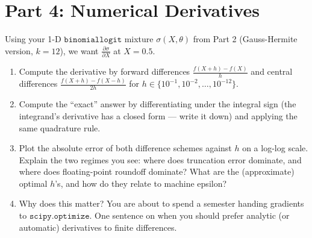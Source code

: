\documentclass{article}
\begin{document}
\section*{Part 4: Numerical Derivatives}
Using your 1-D $\mathtt{binomiallogit}$ mixture $\sigma(X,\theta)$ from Part 2 (Gauss-Hermite version, $k=12$), we want $\frac{\partial \sigma}{\partial X}$ at $X=0.5$.
\begin{enumerate}
\item Compute the derivative by forward differences $\frac{f(X+h)-f(X)}{h}$ and central differences $\frac{f(X+h)-f(X-h)}{2h}$ for $h \in \{10^{-1}, 10^{-2}, \ldots, 10^{-12}\}$.
\item Compute the ``exact'' answer by differentiating under the integral sign (the integrand's derivative has a closed form --- write it down) and applying the same quadrature rule.
\item Plot the absolute error of both difference schemes against $h$ on a log-log scale. Explain the two regimes you see: where does truncation error dominate, and where does floating-point roundoff dominate? What are the (approximate) optimal $h$'s, and how do they relate to machine epsilon?
\item Why does this matter? You are about to spend a semester handing gradients to $\mathtt{scipy.optimize}$. One sentence on when you should prefer analytic (or automatic) derivatives to finite differences.
\end{enumerate}
\end{document}
